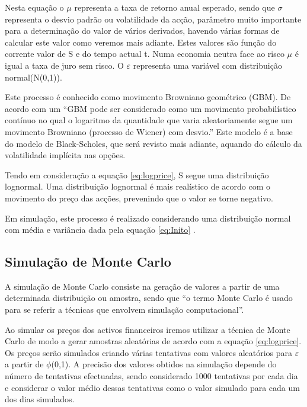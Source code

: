 \documentclass[
  12pt,
  a4paper,
  openany]{book}
\begin{document}
Nesta equação o \(\mu\) representa a taxa de retorno anual esperado, sendo que \(\sigma\) representa o desvio padrão ou volatilidade da acção, parâmetro muito importante para a determinação do valor de vários derivados, havendo várias formas de calcular este valor como veremos mais adiante. Estes valores são função do corrente valor de S e do tempo actual t. Numa economia neutra face ao risco \(\mu\) é igual a taxa de juro sem risco. O \(\varepsilon\) representa uma variável com distribuição normal(N(0,1)).

Este processo é conhecido como movimento Browniano geométrico (GBM). De acordo com \citet{AppliedFinancial} um ``GBM pode ser considerado como um movimento probabilístico contínuo no qual o logaritmo da quantidade que varia aleatoriamente segue um movimento Browniano (processo de Wiener) com desvio.'' Este modelo é a base do modelo de Black-Scholes, que será revisto mais adiante, aquando do cálculo da volatilidade implícita nas opções.

Tendo em consideração a equação \eqref{eq:logprice}, S segue uma distribuição lognormal. Uma distribuição lognormal é mais realístico de acordo com o movimento do preço das acções, prevenindo que o valor se torne negativo.

Em simulação, este processo é realizado considerando uma distribuição normal com média e variância dada pela equação \eqref{eq:Inito} \citep{FRM1}.

\hypertarget{simulauxe7uxe3o-de-monte-carlo}{%
\subsection{Simulação de Monte Carlo}\label{simulauxe7uxe3o-de-monte-carlo}}

A simulação de Monte Carlo consiste na geração de valores a partir de uma determinada distribuição ou amostra, sendo que ``o termo Monte Carlo é usado para se referir a técnicas que envolvem simulação computacional''\citep[pp.457]{ProgSim}.

Ao simular os preços dos activos financeiros iremos utilizar a técnica de Monte Carlo de modo a gerar amostras aleatórias de acordo com a equação \eqref{eq:logprice}. Os preços serão simulados criando várias tentativas com valores aleatórios para \(\varepsilon\) a partir de \(\phi\)(0,1). A precisão dos valores obtidos na simulação depende do número de tentativas efectuadas, sendo considerado 1000 tentativas por cada dia e considerar o valor médio dessas tentativas como o valor simulado para cada um dos dias simulados.
\end{document}
